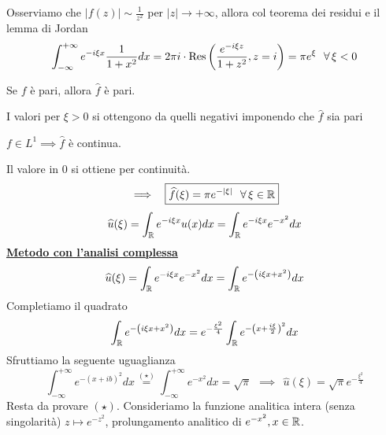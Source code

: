 \begin{figure}[htpb]
\end{figure}
\FloatBarrier

Osserviamo che $| f(z)| \sim \frac{1}{z^{2}}$ per $| z| \rightarrow + \infty $, allora col teorema dei residui e il lemma di Jordan
\begin{equation*}
\int^{+ \infty}_{- \infty} e^{- i\xi x}\frac{1}{1 + x^{2}} dx = 2\pi i \cdot \Res \left(\frac{e^{- i\xi z}}{1 + z^{2}}, z = i\right) = \pi e^{\xi} \ \ \forall \xi < 0
\end{equation*}
\begin{rem}
Se $f$ è pari, allora $\hat{f}$ è pari.
\end{rem}
I valori per $\xi > 0$ si ottengono da quelli negativi imponendo che $\hat{f}$ sia pari
\begin{rem}
$f\in L^{1} \implies \hat{f}$ è continua.
\end{rem}
Il valore in $0$ si ottiene per continuità.
\begin{equation*}
\implies \ \ \boxed{\hat{f}(\xi) = \pi e^{- | \xi |} \ \ \forall \xi \in \RR}
\end{equation*}
\Soluzione
\begin{equation*}
\widehat{u}(\xi) = \int_{\mathbb{R}} e^{- i\xi x} u(x) dx = \int_{\mathbb{R}} e^{- i\xi x} e^{- x^{2}} dx
\end{equation*}
\textbf{\underline{Metodo con l'analisi complessa}}
\begin{equation*}
\widehat{u}(\xi) = \int_{\mathbb{R}} e^{- i\xi x} e^{- x^{2}} dx = \int_{\mathbb{R}} e^{- \left(i\xi x + x^{2}\right)} dx
\end{equation*}
Completiamo il quadrato
\begin{equation*}
\int_{\mathbb{R}} e^{- \left(i\xi x + x^{2}\right)} dx = e^{- \frac{\xi^{2}}{4}}\int_{\mathbb{R}} e^{- \left(x + \frac{i\xi}{2}\right)^{2}} dx
\end{equation*}
Sfruttiamo la seguente uguaglianza
\begin{equation*}
\int^{+ \infty}_{- \infty} e^{- (x + ib)^{2}} dx\overset{(\star)}{=}\int^{+ \infty}_{- \infty} e^{- x^{2}} dx = \sqrt{\pi} \ \ \implies \ \ \boxed{\hat{u}(\xi) = \sqrt{\pi} e^{- \frac{\xi^{2}}{4}}}
\end{equation*}
Resta da provare $(\star)$. Consideriamo la funzione analitica intera (senza singolarità) $z\mapsto e^{- z^{2}}$, prolungamento analitico di $e^{- x^{2}}, x\in \mathbb{R} $.



